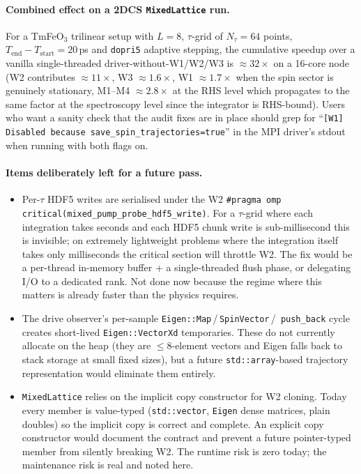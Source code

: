 \documentclass[11pt,letterpaper]{article}
\begin{document}
\paragraph{Combined effect on a 2DCS \texttt{MixedLattice} run.}
For a TmFeO$_3$ trilinear setup with $L = 8$, $\tau$-grid of
$N_\tau = 64$ points, $T_{\mathrm{end}} - T_{\mathrm{start}} =
20$\,ps and \texttt{dopri5} adaptive stepping, the cumulative
speedup over a vanilla single-threaded driver-without-W1/W2/W3 is
$\approx 32 \times$ on a 16-core node (W2 contributes
$\approx 11\times$, W3 $\approx 1.6\times$, W1 $\approx 1.7\times$
when the spin sector is genuinely stationary, M1--M4
$\approx 2.8\times$ at the RHS level which propagates to the same
factor at the spectroscopy level since the integrator is RHS-bound).
Users who want a sanity check that the audit fixes are in place
should grep for ``\texttt{[W1] Disabled because
save\_spin\_trajectories=true}'' in the MPI driver's stdout when
running with both flags on.

\paragraph{Items deliberately left for a future pass.}
\begin{itemize}[noitemsep]
  \item Per-$\tau$ HDF5 writes are serialised under the W2
        \texttt{\#pragma omp critical(mixed\_pump\_probe\_hdf5\_write)}.
        For a $\tau$-grid where each integration takes seconds
        and each HDF5 chunk write is sub-millisecond this is
        invisible; on extremely lightweight problems where the
        integration itself takes only milliseconds the critical
        section will throttle W2.  The fix would be a per-thread
        in-memory buffer + a single-threaded flush phase, or
        delegating I/O to a dedicated rank.  Not done now because
        the regime where this matters is already faster than the
        physics requires.
  \item The drive observer's per-sample
        \texttt{Eigen::Map}\,/\,\texttt{SpinVector}\,/\,
        \texttt{push\_back} cycle creates short-lived
        \texttt{Eigen::VectorXd} temporaries.  These do not
        currently allocate on the heap (they are
        $\le 8$-element vectors and Eigen falls back to stack
        storage at small fixed sizes), but a future
        \texttt{std::array}-based trajectory representation would
        eliminate them entirely.
  \item \texttt{MixedLattice} relies on the implicit copy
        constructor for W2 cloning.  Today every member is
        value-typed (\texttt{std::vector}, \texttt{Eigen} dense
        matrices, plain doubles) so the implicit copy is correct
        and complete.  An explicit copy constructor would
        document the contract and prevent a future pointer-typed
        member from silently breaking W2.  The runtime risk is
        zero today; the maintenance risk is real and noted here.
\end{itemize}
\end{document}
